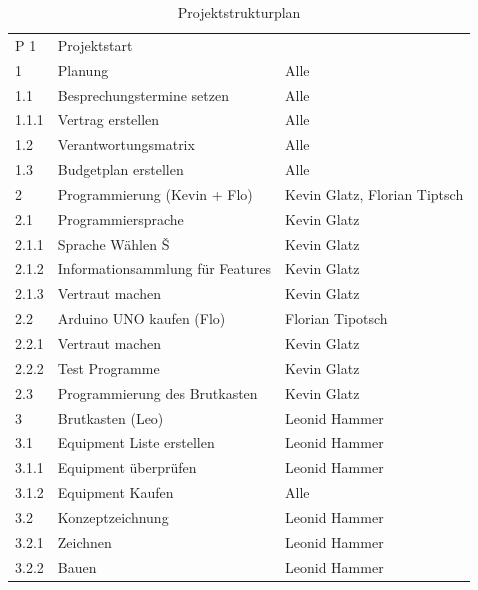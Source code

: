 \begin{table}[H]
	\centering
	\caption{Projektstrukturplan}
	\label{projektstrukturplan}
	\begin{tabular}{lll}
		P 1   & Projektstart                     &                                \\
		1     & Planung                          & Alle                           \\
		1.1   & Besprechungstermine setzen       & Alle                           \\
		1.1.1 & Vertrag erstellen                & Alle                           \\
		1.2   & Verantwortungsmatrix             & Alle                           \\
		1.3   & Budgetplan erstellen             & Alle                           \\
		2     & Programmierung (Kevin + Flo)     & Kevin Glatz, Florian Tiptsch   \\
		2.1   & Programmiersprache               & Kevin Glatz                    \\
		2.1.1 & Sprache Wählen Š                 & Kevin Glatz                    \\
		2.1.2 & Informationsammlung für Features & Kevin Glatz                    \\
		2.1.3 & Vertraut machen                  & Kevin Glatz                    \\
		2.2   & Arduino UNO kaufen (Flo)         & Florian Tipotsch               \\
		2.2.1 & Vertraut machen                  & Kevin Glatz                    \\
		2.2.2 & Test Programme                   & Kevin Glatz                    \\
		2.3   & Programmierung des Brutkasten    & Kevin Glatz                    \\
		3     & Brutkasten (Leo)                 & Leonid Hammer                  \\
		3.1   & Equipment Liste erstellen        & Leonid Hammer                  \\
		3.1.1 & Equipment überprüfen             & Leonid Hammer                  \\
		3.1.2 & Equipment Kaufen                 & Alle                           \\
		3.2   & Konzeptzeichnung                 & Leonid Hammer                  \\
		3.2.1 & Zeichnen                         & Leonid Hammer                  \\
		3.2.2 & Bauen                            & Leonid Hammer                  \\
		

\end{tabular}
\end{table}
